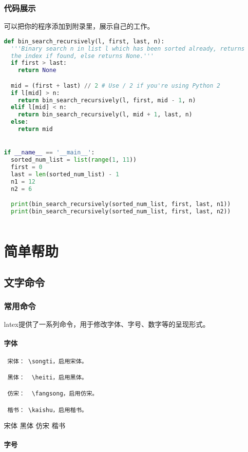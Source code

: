 \documentclass{LZUthesis}
\begin{document}
\subsection{代码展示} 
可以把你的程序添加到附录里，展示自己的工作。
\begin{lstlisting}[language={python}]
def bin_search_recursively(l, first, last, n):
  '''Binary search n in list l which has been sorted already, returns
  the index if found, else returns None.'''
  if first > last:
    return None

  mid = (first + last) // 2 # Use / 2 if you're using Python 2
  if l[mid] > n:
    return bin_search_recursively(l, first, mid - 1, n)
  elif l[mid] < n:
    return bin_search_recursively(l, mid + 1, last, n)
  else:
    return mid


if __name__ == '__main__':
  sorted_num_list = list(range(1, 11))
  first = 0
  last = len(sorted_num_list) - 1
  n1 = 12
  n2 = 6

  print(bin_search_recursively(sorted_num_list, first, last, n1))
  print(bin_search_recursively(sorted_num_list, first, last, n2))
        
\end{lstlisting}


\chapter{简单帮助}
\section{文字命令}
 \subsection{常用命令}
 latex提供了一系列命令，用于修改字体、字号、数字等的呈现形式。
\subsubsection{字体}
\begin{verbatim}
 宋体： \songti，启用宋体。

 黑体：  \heiti，启用黑体。

 仿宋：  \fangsong，启用仿宋。

 楷书： \kaishu，启用楷书。

\end{verbatim}
 {\songti 宋体} {\heiti 黑体}    {\fangsong 仿宋}     {\kaishu 楷书}
 
\subsubsection{字号}
\end{document}
